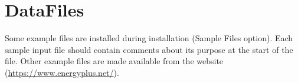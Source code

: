 \section{DataFiles}\label{datafiles}

Some example files are installed during installation (Sample Files option). Each sample input file should contain comments about its purpose at the start of the file. Other example files are made available from the website (\url{https://www.energyplus.net/}).
